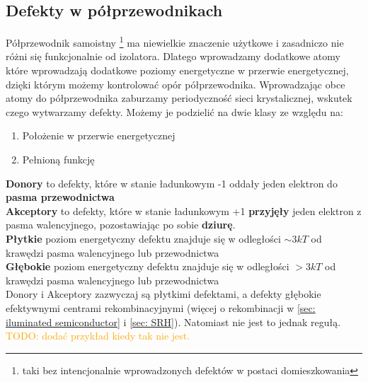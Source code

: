     \subsection{Defekty w półprzewodnikach}
        Półprzewodnik samoistny \footnote{taki bez intencjonalnie wprowadzonych defektów w postaci domieszkowania} ma niewielkie znaczenie użytkowe i zasadniczo nie różni się funkcjonalnie od izolatora. 
        Dlatego wprowadzamy dodatkowe atomy które wprowadzają dodatkowe poziomy energetyczne w przerwie energetycznej, dzięki którym możemy kontrolować opór półprzewodnika. 
        Wprowadzając obce atomy do półprzewodnika zaburzamy periodyczność sieci krystalicznej, wskutek czego wytwarzamy defekty. Możemy je podzielić na dwie klasy ze względu na:
        \begin{enumerate}
            \item Położenie w przerwie energetycznej 
            \item Pełnioną funkcję
        \end{enumerate}
        \textbf{Donory} to defekty, które w stanie ładunkowym -1 oddały jeden elektron do \textbf{pasma przewodnictwa} \\ 
        \textbf{Akceptory} to defekty, które w stanie ładunkowym +1 \textbf{przyjęły} jeden elektron z pasma walencyjnego, pozostawiając po sobie \textbf{dziurę}.  \\ 
        
        \noindent \textbf{Płytkie} poziom energetyczny defektu znajduje się w odległości  $\sim 3kT$ od krawędzi pasma walencyjnego lub przewodnictwa \\
        \textbf{Głębokie} poziom energetyczny defektu znajduje się w odległości $>3kT$ od krawędzi pasma walencyjnego lub przewodnictwa \\

        \noindent Donory i Akceptory zazwyczaj są płytkimi defektami, a defekty głębokie efektywnymi centrami rekombinacyjnymi (więcej o rekombinacji w \ref{sec: iluminated semiconductor} i \ref{sec: SRH}). 
        Natomiast nie jest to jednak regułą.\newline\newline
        \noindent \textcolor{orange}{TODO:  dodać przykład kiedy tak nie jest.}

